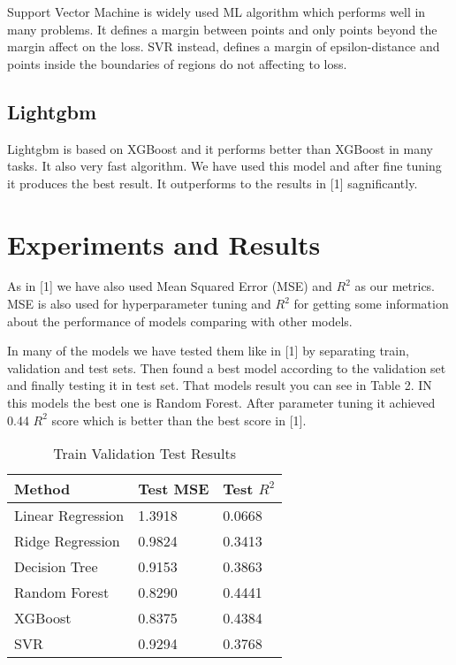 \documentclass{article}
\begin{document}
Support Vector Machine is widely used ML algorithm which performs well in many problems. It defines a margin between points and only points beyond the margin affect on the loss. SVR instead, defines a margin of epsilon-distance and points inside the boundaries of regions do not affecting to loss. 

\subsection{Lightgbm}

Lightgbm is based on XGBoost and it performs better than XGBoost in many tasks. It also very fast algorithm. We have used this model and after fine tuning it produces the best result. It outperforms to the results in [1] sagnificantly. 

\section{Experiments and Results}

As in [1] we have also used Mean Squared Error (MSE) and $R^2$ as our metrics. MSE is also used for hyperparameter tuning and $R^2$ for getting some information about the performance of models comparing with other models. 

In many of the models we have tested them like in [1] by separating train, validation and test sets. Then found a best model according to the validation set and finally testing it in test set. That models result you can see in Table 2. IN this models the best one is Random Forest. After parameter tuning it achieved 0.44 $R^2$ score which is better than the best score in [1]. 

\begin{table}
  \caption{Train Validation Test Results}
  \label{tvt_results-table}
  \centering
  \begin{tabular}{lll}
    \toprule
    Method & Test MSE &  Test $R^2$  \\
    \midrule
    Linear Regression & 1.3918  & 0.0668   \\
    Ridge Regression & 0.9824  & 0.3413   \\
    Decision Tree & 0.9153  & 0.3863   \\
    Random Forest & 0.8290  & 0.4441   \\
    XGBoost & 0.8375 & 0.4384 \\
    SVR & 0.9294 & 0.3768 \\
        \bottomrule
  \end{tabular}
\end{table}
\end{document}
